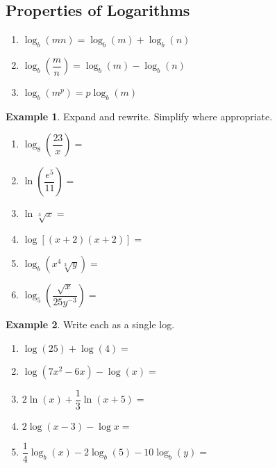 \documentclass[addpoints,12pt]{exam}
\theoremstyle{definition}
\theoremstyle{break}
\theoremstyle{break}
\newtheorem{example}{Example}[subsection]
\begin{document}
\setcounter{section}{12}
\setcounter{subsection}{2}

\subsection{Properties of Logarithms}
\vspace{.15in}

\begin{enumerate}
\item $\log_b{\left(mn\right)} = \log_b{(m)} + \log_b{(n)}$
\vspace{.15in}
\item $\log_b{\left(\dfrac{m}{n}\right)} = \log_b{(m)} - \log_b{(n)}$
\vspace{.15in}
\item $\log_b{\left(m^p\right)} = p\log_b{(m)}$
\vspace{.15in}
\end{enumerate}

\begin{example}
Expand and rewrite. Simplify where appropriate.
\begin{enumerate}
\item $\log_8{\left(\dfrac{23}{x}\right)} = $
\vspace{.75in}
\item $\ln{\left(\dfrac{e^5}{11}\right)} = $
\vspace{.75in}
\item $\ln{\sqrt[3]{x}} = $
\vspace{.75in}
\item $\log{[(x+2)(x+2)]} = $
\newpage

\item $\log_b{\left(x^4\sqrt[3]{y}\right)} = $
\vspace{1in}
\item $\log_5{\left(\dfrac{\sqrt{x}}{25y^{-3}}\right)} = $
\vspace{1in}
\end{enumerate}
\end{example}

\begin{example}
Write each as a single log.
\begin{enumerate}
\item $\log{(25)} + \log{(4)} = $
\vspace{1in}
\item $\log{(7x^2 - 6x)} - \log{(x)} = $
\vspace{1in}
\item $2\ln{(x)} + \dfrac{1}{3}\ln{(x+5)} = $
\newpage
\item $2\log{(x-3)} - \log{x} = $
\vspace{1in}
\item $\dfrac{1}{4}\log_b{(x)} - 2\log_b{(5)} - 10\log_b{(y)} = $
\end{enumerate}
\end{example}
\end{document}
